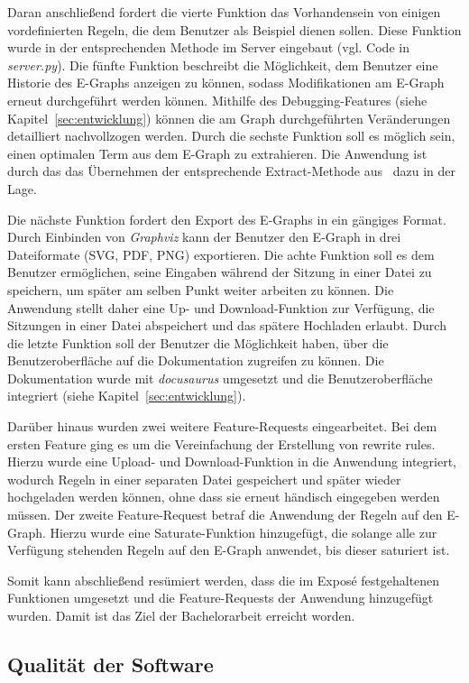 Daran anschließend fordert die vierte Funktion das Vorhandensein von einigen vordefinierten Regeln, die dem Benutzer als Beispiel dienen sollen.
Diese Funktion wurde in der entsprechenden Methode im Server eingebaut (vgl. Code in \textit{server.py}).
Die fünfte Funktion beschreibt die Möglichkeit, dem Benutzer eine Historie des E-Graphs anzeigen zu können, sodass Modifikationen am E-Graph erneut durchgeführt werden können.
Mithilfe des Debugging-Features (siehe Kapitel~\ref{sec:entwicklung}) können die am Graph durchgeführten Veränderungen detailliert nachvollzogen werden.
Durch die sechste Funktion soll es möglich sein, einen optimalen Term aus dem E-Graph zu extrahieren. 
Die Anwendung ist durch das das Übernehmen der entsprechende Extract-Methode aus~\cite{devito} dazu in der Lage.

Die nächste Funktion fordert den Export des E-Graphs in ein gängiges Format. Durch Einbinden von \textit{Graphviz} kann der Benutzer den E-Graph in drei Dateiformate (SVG, PDF, PNG) exportieren.
Die achte Funktion soll es dem Benutzer ermöglichen, seine Eingaben während der Sitzung in einer Datei zu speichern, um später am selben Punkt weiter arbeiten zu können.
Die Anwendung stellt daher eine Up- und Download-Funktion zur Verfügung, die Sitzungen in einer Datei abspeichert und das spätere Hochladen erlaubt.
Durch die letzte Funktion soll der Benutzer die Möglichkeit haben, über die Benutzeroberfläche auf die Dokumentation zugreifen zu können. Die Dokumentation wurde mit \textit{docusaurus}
umgesetzt und die Benutzeroberfläche integriert (siehe Kapitel~\ref{sec:entwicklung}).

Darüber hinaus wurden zwei weitere Feature-Requests eingearbeitet. 
Bei dem ersten Feature ging es um die Vereinfachung der Erstellung von rewrite rules. Hierzu wurde eine Upload- und Download-Funktion in die Anwendung integriert, wodurch
Regeln in einer separaten Datei gespeichert und später wieder hochgeladen werden können, ohne dass sie erneut händisch eingegeben werden müssen.
Der zweite Feature-Request betraf die Anwendung der Regeln auf den E-Graph. Hierzu wurde eine Saturate-Funktion hinzugefügt, die solange alle zur Verfügung stehenden
Regeln auf den E-Graph anwendet, bis dieser saturiert ist.

Somit kann abschließend resümiert werden, dass die im Exposé festgehaltenen Funktionen umgesetzt und die Feature-Requests der Anwendung hinzugefügt wurden.
Damit ist das Ziel der Bachelorarbeit erreicht worden.

\subsection{Qualität der Software}\label{softwarequalität}

